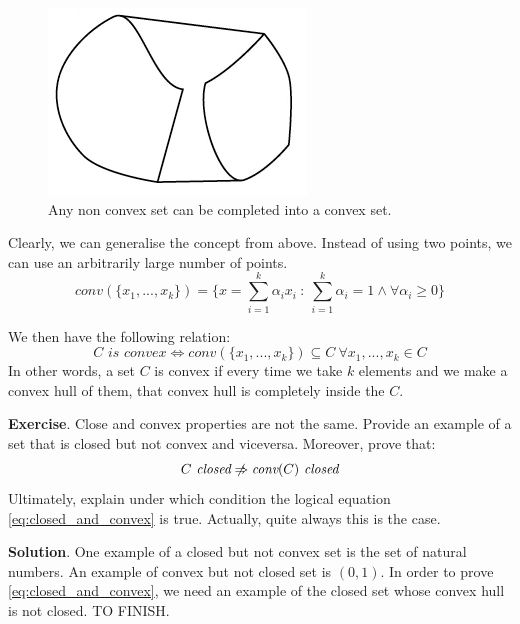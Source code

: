 \begin{figure}
    \centering
    \includegraphics[scale=0.4]{figures/2/chapter2-completed_non_convex_set.png}
    \caption{Any non convex set can be completed into a convex set.}
    \label{fig:chapter2-completed_non_convex_set}
\end{figure}
\par Clearly, we can generalise the concept from above. Instead of using two points, we can use an arbitrarily large number of points.
\begin{equation}
    \textit{conv}(\{x_1,...,x_k\}) = \{x = \sum_{i=1}^k \alpha_i x_i\ :\ \sum_{i=1}^k \alpha_i = 1 \wedge \forall \alpha_i \geq 0\}
\end{equation}
\par We then have the following relation:
\begin{equation}
    C \textit{ is convex} \iff \textit{conv}(\{x_1,...,x_k\}) \subseteq C\  \forall x_1,...,x_k \in C
\end{equation}
In other words, a set $C$ is convex if every time we take $k$ elements and we make a convex hull of them, that convex hull is completely inside the $C$.
\par \textbf{Exercise}. Close and convex properties are not the same. Provide an example of a set that is closed but not convex and viceversa. Moreover, prove that:
\begin{equation}
    \label{eq:closed_and_convex}
    C \textit{ closed} \centernot \Rightarrow \textit{conv}(C) \textit{ closed}
\end{equation}
Ultimately, explain under which condition the logical equation \ref{eq:closed_and_convex} is true. Actually, quite always this is the case.
\par \textbf{Solution}. One example of a closed but not convex set is the set of natural numbers. An example of convex but not closed set is $(0,1)$. In order to prove \ref{eq:closed_and_convex}, we need an example of the closed set whose convex hull is not closed. TO FINISH.
%
